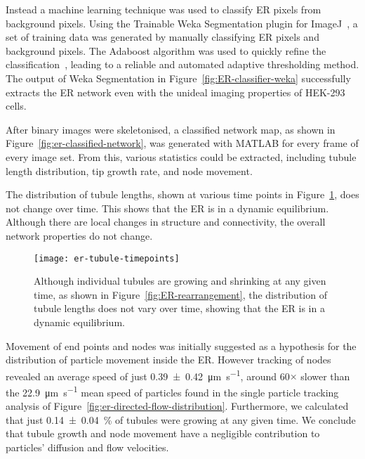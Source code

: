 Instead a machine learning technique was used to classify ER pixels from background pixels. 
Using the Trainable Weka Segmentation plugin for ImageJ~\cite{arganda2017trainable}, a set of training data was generated by manually classifying ER pixels and background pixels. 
The Adaboost algorithm was used to quickly refine the classification~\cite{freund1997decision, schapire1999brief}, leading to a reliable and automated adaptive thresholding method. 
The output of Weka Segmentation in Figure~\ref{fig:ER-classifier-weka} successfully extracts the ER network even with the unideal imaging properties of HEK-293 cells.

After binary images were skeletonised, a classified network map, as shown in Figure~\ref{fig:er-classified-network}, was generated with MATLAB for every frame of every image set. 
From this, various statistics could be extracted, including tubule length distribution, tip growth rate, and node movement. 

The distribution of tubule lengths, shown at various time points in Figure~\ref{fig:er-tubule-timepoints}, does not change over time. 
This shows that the ER is in a dynamic equilibrium. 
Although there are local changes in structure and connectivity, the overall network properties do not change. 

\begin{figure}[b!]
\centering
\texttt{[image: er-tubule-timepoints]}
\caption[ER: Distribution of tubule length remains constant despite growing and shrinking of individual tubules]{Although individual tubules are growing and shrinking at any given time, as shown in Figure~\ref{fig:ER-rearrangement}, the distribution of tubule lengths does not vary over time, showing that the ER is in a dynamic equilibrium. } 
\label{fig:er-tubule-timepoints}
\end{figure}

Movement of end points and nodes was initially suggested as a hypothesis for the distribution of particle movement inside the ER. 
However tracking of nodes revealed an average speed of just \SI[separate-uncertainty=true]{0.39 \pm 0.42}{\micro\metre\per\second}, around 60$\times$ slower than the \SI{22.9}{\micro\metre\per\second} mean speed of particles found in the single particle tracking analysis of Figure~\ref{fig:er-directed-flow-distribution}. 
Furthermore, we calculated that just \SI[separate-uncertainty=true]{0.14 \pm 0.04}{\percent} of tubules were growing at any given time. 
We conclude that tubule growth and node movement have a negligible contribution to particles' diffusion and flow velocities. 

